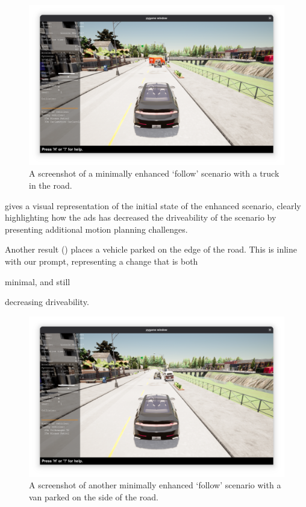 \begin{figure}[htb]
    \centering
    \includegraphics[width=\textwidth]{experiment-material/follow-minimally-enhanced-1-startpoint.png}
    \caption{A screenshot of a minimally enhanced `follow' scenario with a truck in the road.}\label{fig:followMinimallyEnhanced1StartPoint}
\end{figure}

 gives a visual representation of the initial state of
the enhanced scenario, clearly highlighting how the \acrshort{ads} has decreased the driveability of
the scenario by presenting additional motion planning challenges.

Another result () places a vehicle parked on the edge
of the road. This is inline with our prompt, representing a change that is both \begin{inparaenum}
    \item minimal, and still
    \item decreasing driveability.
\end{inparaenum}

\begin{figure}[htb]
    \centering
    \includegraphics[width=\textwidth]{experiment-material/follow-minimally-enhanced-2-startpoint.png}
    \caption{A screenshot of another minimally enhanced `follow' scenario with a van parked on the
        side of the road.}\label{fig:followMinimallyEnhanced2StartPoint}
\end{figure}

